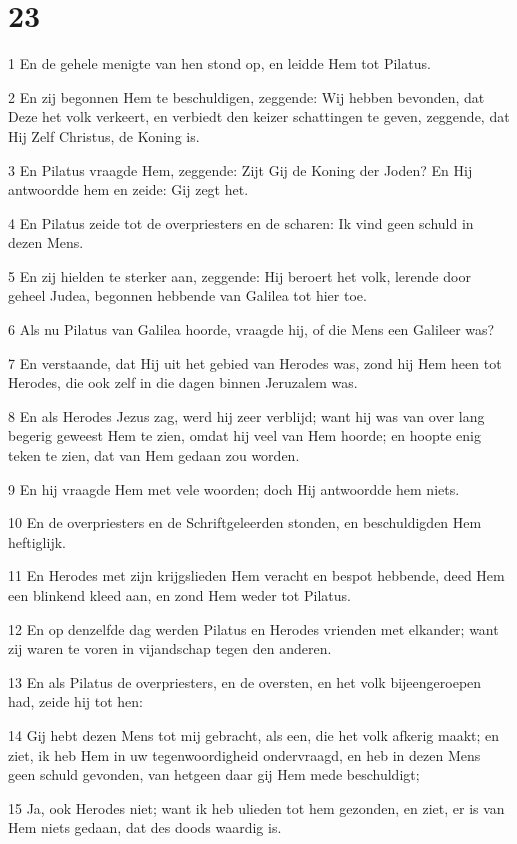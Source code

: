 \chapter{23}

\par 1 En de gehele menigte van hen stond op, en leidde Hem tot Pilatus.
\par 2 En zij begonnen Hem te beschuldigen, zeggende: Wij hebben bevonden, dat Deze het volk verkeert, en verbiedt den keizer schattingen te geven, zeggende, dat Hij Zelf Christus, de Koning is.
\par 3 En Pilatus vraagde Hem, zeggende: Zijt Gij de Koning der Joden? En Hij antwoordde hem en zeide: Gij zegt het.
\par 4 En Pilatus zeide tot de overpriesters en de scharen: Ik vind geen schuld in dezen Mens.
\par 5 En zij hielden te sterker aan, zeggende: Hij beroert het volk, lerende door geheel Judea, begonnen hebbende van Galilea tot hier toe.
\par 6 Als nu Pilatus van Galilea hoorde, vraagde hij, of die Mens een Galileer was?
\par 7 En verstaande, dat Hij uit het gebied van Herodes was, zond hij Hem heen tot Herodes, die ook zelf in die dagen binnen Jeruzalem was.
\par 8 En als Herodes Jezus zag, werd hij zeer verblijd; want hij was van over lang begerig geweest Hem te zien, omdat hij veel van Hem hoorde; en hoopte enig teken te zien, dat van Hem gedaan zou worden.
\par 9 En hij vraagde Hem met vele woorden; doch Hij antwoordde hem niets.
\par 10 En de overpriesters en de Schriftgeleerden stonden, en beschuldigden Hem heftiglijk.
\par 11 En Herodes met zijn krijgslieden Hem veracht en bespot hebbende, deed Hem een blinkend kleed aan, en zond Hem weder tot Pilatus.
\par 12 En op denzelfde dag werden Pilatus en Herodes vrienden met elkander; want zij waren te voren in vijandschap tegen den anderen.
\par 13 En als Pilatus de overpriesters, en de oversten, en het volk bijeengeroepen had, zeide hij tot hen:
\par 14 Gij hebt dezen Mens tot mij gebracht, als een, die het volk afkerig maakt; en ziet, ik heb Hem in uw tegenwoordigheid ondervraagd, en heb in dezen Mens geen schuld gevonden, van hetgeen daar gij Hem mede beschuldigt;
\par 15 Ja, ook Herodes niet; want ik heb ulieden tot hem gezonden, en ziet, er is van Hem niets gedaan, dat des doods waardig is.
